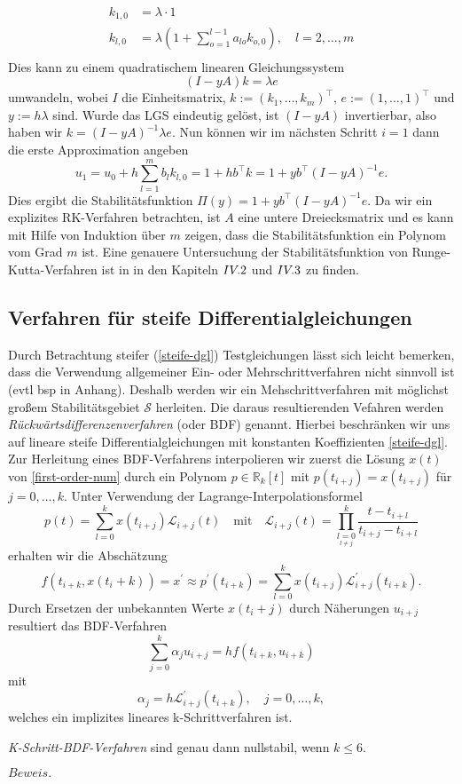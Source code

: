 \begin{align*}
    k_{1,0} &= \lambda \cdot 1 \\
    k_{l,0} &= \lambda \left( 1 + \sum_{o = 1}^{l-1} a_{lo} k_{o,0} \right), \quad l = 2, \dots, m \\
\end{align*}
Dies kann zu einem quadratischem linearen Gleichungssystem
\[
    (I - yA)k = \lambda e
\]
umwandeln, wobei $I$ die Einheitsmatrix, $k:= (k_1, \dots, k_m)^{\intercal}$, $e:=(1, \dots, 1)^{\intercal}$
und $y := h\lambda$ sind. Wurde das LGS eindeutig gelöst, ist $(I-yA)$ invertierbar, also haben wir
$k = (I-yA)^{-1} \lambda e$. Nun können wir im nächsten Schritt $i=1$ dann die erste Approximation angeben
\[
    u_1 = u_0 + h \sum_{l=1}^{m} b_l k_{l,0} = 1 + h b^{\intercal} k = 1 + yb^{\intercal}( I - yA)^{-1}e.
\]
Dies ergibt die Stabilitätsfunktion $\Pi(y) = 1 + yb^{\intercal}( I - yA)^{-1}e.$ Da wir ein explizites
RK-Verfahren betrachten, ist $A$ eine untere Dreiecksmatrix und es kann mit Hilfe von Induktion über $m$ zeigen, dass
die Stabilitätsfunktion ein Polynom vom Grad $m$ ist. Eine genauere Untersuchung der Stabilitätsfunktion von
Runge-Kutta-Verfahren ist in \cite{ernsthairergerhardwannerSolvingOrdinaryDifferentiala} in den Kapiteln $\RNum{4}.2$
und $\RNum{4}.3$ zu finden.

\subsection{Verfahren für steife Differentialgleichungen}
Durch Betrachtung steifer (\ref{steife-dgl}) Testgleichungen lässt sich leicht bemerken, dass die
Verwendung allgemeiner Ein- oder Mehrschrittverfahren nicht sinnvoll ist (evtl bsp in Anhang). Deshalb werden wir ein
Mehschrittverfahren mit möglichst großem Stabilitätsgebiet $\mathcal{S}$ herleiten. Die daraus resultierenden Vefahren
werden \textit{Rückwärtsdifferenzenverfahren} (oder BDF) genannt. Hierbei beschränken wir uns auf lineare steife
Differentialgleichungen mit konstanten Koeffizienten \eqref{steife-dgl}.\\
Zur Herleitung eines BDF-Verfahrens interpolieren wir zuerst die Lösung $x(t)$ von \eqref{first-order-num} durch ein
Polynom $p \in \mathbb{R}_k[t]$ mit $p(t_{i+j}) = x(t_{i+j})$ für $j=0, \dots, k$. Unter Verwendung der
Lagrange-Interpolationsformel
\[
    p(t) = \sum_{l=0}^{k} x(t_{i+j}) \mathcal{L}_{i+j}(t) \quad \text{mit} \quad
    \mathcal{L}_{i+j}(t) = \prod\limits_{\underset{l \neq j}{l=0}}^{k} \frac{t-t_{i+l}}{t_{i+j}-t_{i+l}}
\]
erhalten wir die Abschätzung
\[
    f(t_{i+k},x(t_i+k)) = x^{\prime} \approx p^{\prime}(t_{i+k})
    = \sum_{l=0}^{k} x(t_{i+j})\mathcal{L}^{\prime}_{i+j}(t_{i+k}).
\]
Durch Ersetzen der unbekannten Werte $x(t_i+j)$ durch Näherungen $u_{i+j}$ resultiert das BDF-Verfahren
\[
    \sum_{j=0}^{k}\alpha_j u_{i+j} = h f(t_{i+k}, u_{i+k})
\]
mit
\[
    \alpha_j = h \mathcal{L}^{\prime}_{i+j} (t_{i+k}), \quad j=0,\dots,k,
\]
welches ein implizites lineares k-Schrittverfahren ist.\\
\begin{satz}
    \textit{K-Schritt-BDF-Verfahren} sind genau dann nullstabil, wenn $k \leq 6$.
\end{satz}
$Beweis.$ \cite[381-383]{ernsthairergerhardwannerSolvingOrdinaryDifferential}
